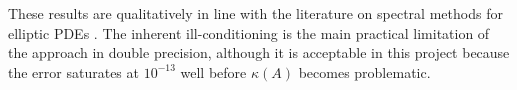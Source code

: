 \documentclass[11pt,a4paper,twoside,pdf]{article}
\numberwithin{equation}{section}
\begin{document}
These results are qualitatively in line with the literature on
spectral methods for elliptic PDEs
\cite{boyd2001chebyshev,trefethen2000spectral,canuto2006spectral}. The
inherent ill-conditioning is the main practical limitation of the
approach in double precision, although it is acceptable in this
project because the error saturates at $10^{-13}$ well before
$\kappa(A)$ becomes problematic.

\newpage


\end{document}
